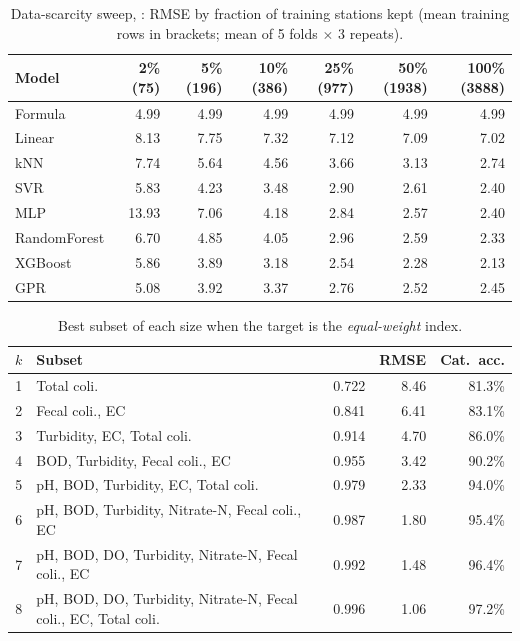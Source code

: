 \begin{table}[h]
\centering\small
\caption{Data-scarcity sweep, : RMSE by fraction of training stations kept (mean training rows in brackets; mean of 5 folds $\times$ 3 repeats).}
\label{tab:app-scar-i3-importance}
\begin{tabular}{lrrrrrr}
\toprule
Model & 2\% (75) & 5\% (196) & 10\% (386) & 25\% (977) & 50\% (1938) & 100\% (3888) \\
\midrule
Formula & 4.99 & 4.99 & 4.99 & 4.99 & 4.99 & 4.99 \\
Linear & 8.13 & 7.75 & 7.32 & 7.12 & 7.09 & 7.02 \\
kNN & 7.74 & 5.64 & 4.56 & 3.66 & 3.13 & 2.74 \\
SVR & 5.83 & 4.23 & 3.48 & 2.90 & 2.61 & 2.40 \\
MLP & 13.93 & 7.06 & 4.18 & 2.84 & 2.57 & 2.40 \\
RandomForest & 6.70 & 4.85 & 4.05 & 2.96 & 2.59 & 2.33 \\
XGBoost & 5.86 & 3.89 & 3.18 & 2.54 & 2.28 & 2.13 \\
GPR & 5.08 & 3.92 & 3.37 & 2.76 & 2.52 & 2.45 \\
\bottomrule
\end{tabular}
\end{table}

\begin{table}[h]
\centering\small
\caption{Best subset of each size when the target is the \emph{equal-weight} index.}
\label{tab:app-ew}
\begin{tabular}{rp{8cm}rrr}
\toprule
$k$ & Subset & \R{} & RMSE & Cat.\ acc. \\
\midrule
1 & Total coli. & 0.722 & 8.46 & 81.3\% \\
2 & Fecal coli., EC & 0.841 & 6.41 & 83.1\% \\
3 & Turbidity, EC, Total coli. & 0.914 & 4.70 & 86.0\% \\
4 & BOD, Turbidity, Fecal coli., EC & 0.955 & 3.42 & 90.2\% \\
5 & pH, BOD, Turbidity, EC, Total coli. & 0.979 & 2.33 & 94.0\% \\
6 & pH, BOD, Turbidity, Nitrate-N, Fecal coli., EC & 0.987 & 1.80 & 95.4\% \\
7 & pH, BOD, DO, Turbidity, Nitrate-N, Fecal coli., EC & 0.992 & 1.48 & 96.4\% \\
8 & pH, BOD, DO, Turbidity, Nitrate-N, Fecal coli., EC, Total coli. & 0.996 & 1.06 & 97.2\% \\
\bottomrule
\end{tabular}
\end{table}

